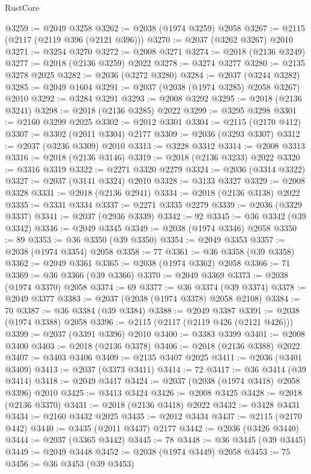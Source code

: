 \begin{lexlean}{RustCore}
\begin{coremodule}
@3259 := @2049 @3258
@3262 := @2038 (@1974 @3259) @2058
@3267 := @2115 (@2117 (@2119 @396 (@2121 @396)))
@3270 := @2037 (@3262 @3267) @2010
@3271 := @3254 @3270
@3272 := @2008 @3271
@3274 := @2018 (@2136 @3249)
@3277 := @2018 (@2136 @3259) @2022
@3278 := @3274 @3277
@3280 := @2135 @3278 @2025
@3282 := @2036 (@3272 @3280)
@3284 := @2037 (@3244 @3282)
@3285 := @2049 @1604
@3291 := @2037 (@2038 (@1974 @3285) @2058 @3267) @2010
@3292 := @3284 @3291
@3293 := @2008 @3292
@3295 := @2018 (@2136 @3241)
@3298 := @2018 (@2136 @3285) @2022
@3299 := @3295 @3298
@3301 := @2160 @3299 @2025
@3302 := @2012 @3301
@3304 := @2115 (@2170 @412)
@3307 := @3302 (@2011 @3304) @2177
@3309 := @2036 (@3293 @3307)
@3312 := @2037 (@3236 @3309) @2010
@3313 := @3228 @3312
@3314 := @2008 @3313
@3316 := @2018 (@2136 @3146)
@3319 := @2018 (@2136 @3233) @2022
@3320 := @3316 @3319
@3322 := @2271 @3320 @2279
@3324 := @2036 (@3314 @3322)
@3327 := @2037 (@3141 @3324) @2010
@3328 := @3133 @3327
@3329 := @2008 @3328
@3331 := @2018 (@2136 @2941)
@3334 := @2018 (@2136 @3138) @2022
@3335 := @3331 @3334
@3337 := @2271 @3335 @2279
@3339 := @2036 (@3329 @3337)
@3341 := @2037 (@2936 @3339)
@3342 := 92
@3345 := @36 @3342 (@39 @3342)
@3346 := @2049 @3345
@3349 := @2038 (@1974 @3346) @2058
@3350 := 89
@3353 := @36 @3350 (@39 @3350)
@3354 := @2049 @3353
@3357 := @2038 (@1974 @3354) @2058
@3358 := 77
@3361 := @36 @3358 (@39 @3358)
@3362 := @2049 @3361
@3365 := @2038 (@1974 @3362) @2058
@3366 := 71
@3369 := @36 @3366 (@39 @3366)
@3370 := @2049 @3369
@3373 := @2038 (@1974 @3370) @2058
@3374 := 69
@3377 := @36 @3374 (@39 @3374)
@3378 := @2049 @3377
@3383 := @2037 (@2038 (@1974 @3378) @2058 @2108)
@3384 := 70
@3387 := @36 @3384 (@39 @3384)
@3388 := @2049 @3387
@3391 := @2038 (@1974 @3388) @2058
@3396 := @2115 (@2117 (@2119 @426 (@2121 @426)))
@3399 := @2037 (@3391 @3396) @2010
@3400 := @3383 @3399
@3401 := @2008 @3400
@3403 := @2018 (@2136 @3378)
@3406 := @2018 (@2136 @3388) @2022
@3407 := @3403 @3406
@3409 := @2135 @3407 @2025
@3411 := @2036 (@3401 @3409)
@3413 := @2037 (@3373 @3411)
@3414 := 72
@3417 := @36 @3414 (@39 @3414)
@3418 := @2049 @3417
@3424 := @2037 (@2038 (@1974 @3418) @2058 @3396) @2010
@3425 := @3413 @3424
@3426 := @2008 @3425
@3428 := @2018 (@2136 @3370)
@3431 := @2018 (@2136 @3418) @2022
@3432 := @3428 @3431
@3434 := @2160 @3432 @2025
@3435 := @2012 @3434
@3437 := @2115 (@2170 @442)
@3440 := @3435 (@2011 @3437) @2177
@3442 := @2036 (@3426 @3440)
@3444 := @2037 (@3365 @3442)
@3445 := 78
@3448 := @36 @3445 (@39 @3445)
@3449 := @2049 @3448
@3452 := @2038 (@1974 @3449) @2058
@3453 := 75
@3456 := @36 @3453 (@39 @3453)

\end{coremodule}
\end{lexlean}
